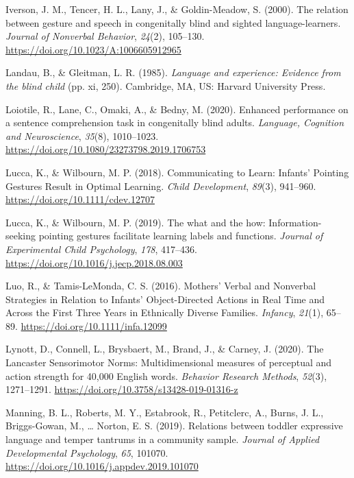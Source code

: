 \documentclass[
  man,floatsintext]{apa6}
\newlength{\cslhangindent}
\newlength{\cslentryspacingunit} %
\newenvironment{CSLReferences}[2] %
 {%
  \setlength{\parindent}{0pt}
  \ifodd #1
  \let\oldpar\par
  \def\par{\hangindent=\cslhangindent\oldpar}
  \fi
  \setlength{\parskip}{#2\cslentryspacingunit}
 }%
 {}
\begin{document}
\begin{CSLReferences}{1}{0}
\leavevmode{}%
Iverson, J. M., Tencer, H. L., Lany, J., \& Goldin-Meadow, S. (2000). The relation between gesture and speech in congenitally blind and sighted language-learners. \emph{Journal of Nonverbal Behavior}, \emph{24}(2), 105--130. \url{https://doi.org/10.1023/A:1006605912965}

\leavevmode{}%
Landau, B., \& Gleitman, L. R. (1985). \emph{Language and experience: {Evidence} from the blind child} (pp. xi, 250). {Cambridge, MA, US}: {Harvard University Press}.

\leavevmode{}%
Loiotile, R., Lane, C., Omaki, A., \& Bedny, M. (2020). Enhanced performance on a sentence comprehension task in congenitally blind adults. \emph{Language, Cognition and Neuroscience}, \emph{35}(8), 1010--1023. \url{https://doi.org/10.1080/23273798.2019.1706753}

\leavevmode{}%
Lucca, K., \& Wilbourn, M. P. (2018). Communicating to {Learn}: {Infants}' {Pointing Gestures Result} in {Optimal Learning}. \emph{Child Development}, \emph{89}(3), 941--960. \url{https://doi.org/10.1111/cdev.12707}

\leavevmode{}%
Lucca, K., \& Wilbourn, M. P. (2019). The what and the how: {Information-seeking} pointing gestures facilitate learning labels and functions. \emph{Journal of Experimental Child Psychology}, \emph{178}, 417--436. \url{https://doi.org/10.1016/j.jecp.2018.08.003}

\leavevmode{}%
Luo, R., \& Tamis-LeMonda, C. S. (2016). Mothers' {Verbal} and {Nonverbal Strategies} in {Relation} to {Infants}' {Object-Directed Actions} in {Real Time} and {Across} the {First Three Years} in {Ethnically Diverse Families}. \emph{Infancy}, \emph{21}(1), 65--89. \url{https://doi.org/10.1111/infa.12099}

\leavevmode{}%
Lynott, D., Connell, L., Brysbaert, M., Brand, J., \& Carney, J. (2020). The {Lancaster Sensorimotor Norms}: Multidimensional measures of perceptual and action strength for 40,000 {English} words. \emph{Behavior Research Methods}, \emph{52}(3), 1271--1291. \url{https://doi.org/10.3758/s13428-019-01316-z}

\leavevmode{}%
Manning, B. L., Roberts, M. Y., Estabrook, R., Petitclerc, A., Burns, J. L., Briggs-Gowan, M., \ldots{} Norton, E. S. (2019). Relations between toddler expressive language and temper tantrums in a community sample. \emph{Journal of Applied Developmental Psychology}, \emph{65}, 101070. \url{https://doi.org/10.1016/j.appdev.2019.101070}


\end{CSLReferences}
\end{document}
